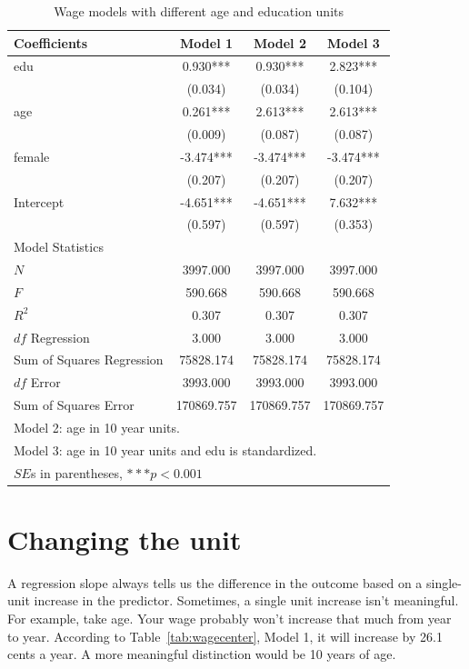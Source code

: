 \begin{table}[htbp]\centering
\caption{ Wage models with different age and education units
\label{tab:wagereg_alt}}
\begin{tabular}{lccc}
\hline
Coefficients&Model 1&Model 2&Model 3 \\
\hline
edu &    0.930***&    0.930***&    2.823***\\
      &   (0.034)  &   (0.034)  &   (0.104)  \\
age     &    0.261***&    2.613***&    2.613***\\
      &   (0.009)  &   (0.087)  &   (0.087)  \\
female   &   -3.474***&   -3.474***&   -3.474***\\
      &   (0.207)  &   (0.207)  &   (0.207)  \\
Intercept    &   -4.651***&   -4.651***&    7.632***\\
      &   (0.597)  &   (0.597)  &   (0.353)  \\
\hline
\multicolumn{4}{l}{Model Statistics} \\
\hline
$N$ &  3997.000  &  3997.000  &  3997.000  \\
$F$ &   590.668  &   590.668  &   590.668  \\
$R^2$ &    0.307  &    0.307  &    0.307  \\
$df$ Regression &    3.000  &    3.000  &    3.000  \\
Sum of Squares Regression 	 &  75828.174  &  75828.174  &  75828.174  \\
$df$ Error 		 &  3993.000  &  3993.000  &  3993.000  \\
Sum of Squares Error 	 & 170869.757  & 170869.757  & 170869.757  \\
\hline
\multicolumn{4}{l}{Model 2: age in 10 year units.} \\
\multicolumn{4}{l}{Model 3: age in 10 year units and edu is standardized.} \\
\multicolumn{4}{l}{$SE$s in parentheses, $***p<0.001$} \\
\hline
\end{tabular}
\end{table}

\section{Changing the unit}

A regression slope always tells us the difference in the outcome based on a single-unit increase in the predictor. Sometimes, a single unit increase isn't meaningful. For example, take age. Your wage probably won't increase that much from year to year. According to Table~\ref{tab:wagecenter}, Model 1, it will increase by 26.1 cents a year. A more meaningful distinction would be 10 years of age.

